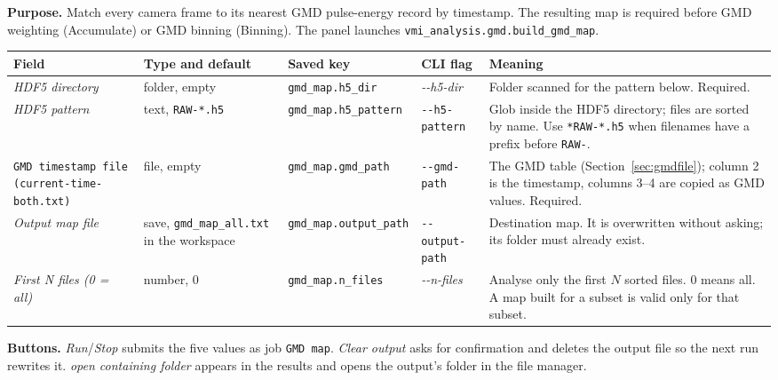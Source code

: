 \documentclass[11pt,a4paper]{article}
\newcommand{\code}[1]{\texttt{#1}}
\begin{document}
\textbf{Purpose.} Match every camera frame to its nearest GMD pulse-energy
record by timestamp. The resulting map is required before GMD weighting
(Accumulate) or GMD binning (Binning). The panel launches
\code{vmi\_\allowbreak{}analysis.gmd.build\_\allowbreak{}gmd\_\allowbreak{}map}.

\begin{center}
\footnotesize
\begin{longtable}{@{}L{3.4cm}L{2.3cm}L{2.5cm}L{2.8cm}L{4.9cm}@{}}
\toprule
Field & Type and default & Saved key & CLI flag & Meaning \\
\midrule
\endhead
\bottomrule
\endfoot
\emph{HDF5 directory} & folder, empty & \code{gmd\_\allowbreak{}map.\allowbreak{}h5\_\allowbreak{}dir} &
\emph{-\allowbreak{}-\allowbreak{}h5-\allowbreak{}dir} & Folder scanned for the pattern below. Required. \\
\addlinespace
\emph{HDF5 pattern} & text, \code{RAW-\allowbreak{}*.\allowbreak{}h5} &
\code{gmd\_\allowbreak{}map.\allowbreak{}h5\_\allowbreak{}pattern} &
\code{-\allowbreak{}-\allowbreak{}h5-\allowbreak{}pattern} & Glob inside the HDF5 directory; files are
sorted by name. Use \code{*RAW-\allowbreak{}*.\allowbreak{}h5} when filenames have a prefix before
\code{RAW-}. \\
\addlinespace
\code{GMD timestamp file (current-\allowbreak{}time-\allowbreak{}both.txt)} & file, empty &
\code{gmd\_\allowbreak{}map.gmd\_\allowbreak{}path} & \code{-\allowbreak{}-\allowbreak{}gmd-\allowbreak{}path} & The GMD table
(Section~\ref{sec:gmdfile}); column 2 is the timestamp, columns 3--4 are
copied as GMD values. Required. \\
\addlinespace
\emph{Output map file} & save, \code{gmd\_\allowbreak{}map\_\allowbreak{}all.\allowbreak{}txt} in the workspace &
\code{gmd\_\allowbreak{}map.output\_\allowbreak{}path} & \code{-\allowbreak{}-\allowbreak{}output-\allowbreak{}path} & Destination map. It is
overwritten without asking; its folder must already exist. \\
\addlinespace
\emph{First N files (0 = all)} & number, 0 & \code{gmd\_\allowbreak{}map.\allowbreak{}n\_\allowbreak{}files} &
\emph{-\allowbreak{}-\allowbreak{}n-\allowbreak{}files} & Analyse only the first $N$ sorted files. 0 means all.
A map built for a subset is valid only for that subset. \\
\end{longtable}
\end{center}

\textbf{Buttons.} \emph{Run}/\emph{Stop} submits the five values as job
\code{GMD map}. \emph{Clear output} asks for confirmation and deletes the
output file so the next run rewrites it. \emph{open containing folder}
appears in the results and opens the output's folder in the file manager.
\end{document}
